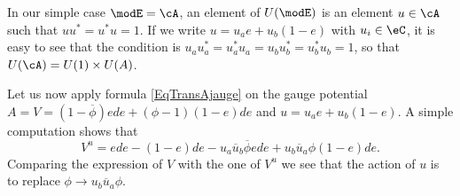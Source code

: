 In our simple case $\modE=\cA$, an element of $U(\modE)$ is an element $u\in\cA$ such that $uu^*=u^*u=1$. If we write $u=u_ae+u_b(1-e)$ with $u_i\in\eC$, it is easy to see that the condition is $u_au_a^*=u_a^*u_a= u_bu_b^*=u_b^*u_b=1$, so that $U(\cA)=U(1)\times U(A)$.

Let us now apply formula \eqref{EqTransAjauge} on the gauge potential $A=V=(1-\overline{ \phi })ede+(\phi-1)(1-e)de$ and $u=u_ae+u_b(1-e)$. A simple computation shows that
\[
	V^u=ede-(1-e)de-u_a\overline{ u }_b\overline{ \phi }ede+u_b\overline{ u }_a\phi(1-e)de.
\]
Comparing the expression of $V$ with the one of $V^u$ we see that the action of $u$ is to replace $\phi\to u_b\overline{ u }_a\phi$.
